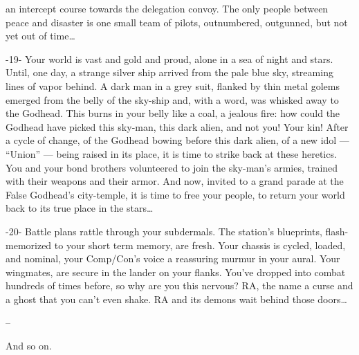 an intercept course towards the delegation convoy. The only people between peace and disaster
is one small team of pilots, outnumbered, outgunned, but not yet out of time…

                                                        -19-
Your world  is vast and gold and proud, alone in a sea of night and stars. Until, one day, a strange
silver ship arrived from the pale blue sky, streaming lines of vapor behind. A dark man in a grey
suit, flanked by thin metal golems emerged from the belly of the sky-ship and, with a word, was
whisked away to the Godhead. This burns in your belly like a coal, a jealous fire: how could the
Godhead have picked this sky-man, this dark alien, and not you! Your kin! After a cycle of change,
of the Godhead bowing before this dark alien, of a new idol — ``Union'' — being raised in its
place, it is time to strike back at these heretics. You and your bond brothers volunteered to join
the sky-man’s armies, trained with their weapons and their armor. And now, invited to a grand
parade at the False Godhead’s city-temple, it is time to free your people, to return your world
back to its true place in the stars…

                                                        -20-
Battle plans rattle through your subdermals. The station’s blueprints, flash-memorized to your
short term memory, are fresh. Your chassis is cycled, loaded, and nominal, your Comp/Con’s
voice a reassuring murmur in your aural. Your wingmates, are secure in the lander on your flanks.
You’ve dropped into combat hundreds of times before, so why are you this nervous? RA, the
name a curse and a ghost that you can’t even shake. RA and its demons wait behind those
doors…

--

And so on.

